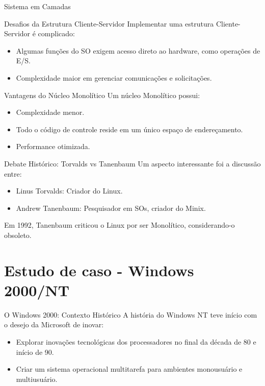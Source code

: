 \documentclass{beamer}
\begin{document}
\begin{frame}{Sistema em Camadas}
\begin{frame}{Desafios da Estrutura Cliente-Servidor}
    Implementar uma estrutura Cliente-Servidor é complicado:
    \begin{itemize}
        \item Algumas funções do SO exigem acesso direto ao hardware, como operações de E/S.
        \item Complexidade maior em gerenciar comunicações e solicitações.
    \end{itemize}
\end{frame}

\begin{frame}{Vantagens do Núcleo Monolítico}
    Um núcleo Monolítico possui:
    \begin{itemize}
        \item Complexidade menor.
        \item Todo o código de controle reside em um único espaço de endereçamento.
        \item Performance otimizada.
    \end{itemize}
\end{frame}

\begin{frame}{Debate Histórico: Torvalds vs Tanenbaum}
    Um aspecto interessante foi a discussão entre:
    \begin{itemize}
        \item Linus Torvalds: Criador do Linux.
        \item Andrew Tanenbaum: Pesquisador em SOs, criador do Minix.
    \end{itemize}
    Em 1992, Tanenbaum criticou o Linux por ser Monolítico, considerando-o obsoleto.
\end{frame}







\section{Estudo de caso - Windows 2000/NT}
\begin{frame}{O Windows 2000: Contexto Histórico}
    A história do Windows NT teve início com o desejo da Microsoft de inovar:
    \begin{itemize}
        \item Explorar inovações tecnológicas dos processadores no final da década de 80 e início de 90.
        \item Criar um sistema operacional multitarefa para ambientes monousuário e multiusuário.
    \end{itemize}
\end{frame}


\end{frame}
\end{document}
